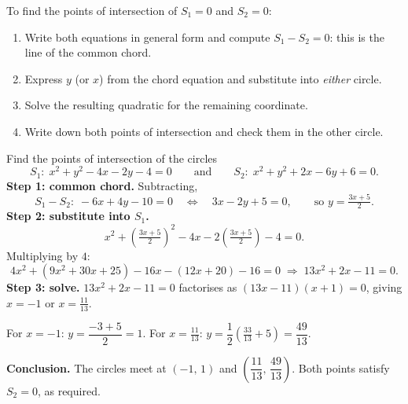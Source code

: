 \documentclass[11pt]{article}
\begin{document}
\begin{methode}
To find the points of intersection of $S_{1}=0$ and $S_{2}=0$:
\begin{enumerate}
\item Write both equations in general form and compute $S_{1}-S_{2}=0$: this is the line of the common chord.
\item Express $y$ (or $x$) from the chord equation and substitute into \emph{either} circle.
\item Solve the resulting quadratic for the remaining coordinate.
\item Write down both points of intersection and check them in the other circle.
\end{enumerate}
\end{methode}

\begin{exoresolu}
Find the points of intersection of the circles
\[
S_{1}:\; x^{2}+y^{2}-4x-2y-4=0
\qquad\text{and}\qquad
S_{2}:\; x^{2}+y^{2}+2x-6y+6=0.
\]
\tcblower
\textbf{Step 1: common chord.} Subtracting,
\[
S_{1}-S_{2}:\; -6x+4y-10=0
\quad\Longleftrightarrow\quad
3x-2y+5=0,
\qquad\text{so } y=\tfrac{3x+5}{2}.
\]
\textbf{Step 2: substitute into $S_{1}$.}
\[
x^{2}+\left(\tfrac{3x+5}{2}\right)^{2}-4x-2\left(\tfrac{3x+5}{2}\right)-4=0.
\]
Multiplying by $4$:
\[
4x^{2}+(9x^{2}+30x+25)-16x-(12x+20)-16=0
\;\Longrightarrow\;
13x^{2}+2x-11=0.
\]
\textbf{Step 3: solve.} $13x^{2}+2x-11=0$ factorises as $(13x-11)(x+1)=0$, giving $x=-1$ or $x=\tfrac{11}{13}$.

For $x=-1$: $y=\dfrac{-3+5}{2}=1$. For $x=\tfrac{11}{13}$: $y=\dfrac{1}{2}\left(\tfrac{33}{13}+5\right)=\dfrac{49}{13}$.

\textbf{Conclusion.} The circles meet at $\left(-1,\,1\right)$ and $\left(\dfrac{11}{13},\,\dfrac{49}{13}\right)$. Both points satisfy $S_{2}=0$, as required.
\end{exoresolu}
\end{document}
